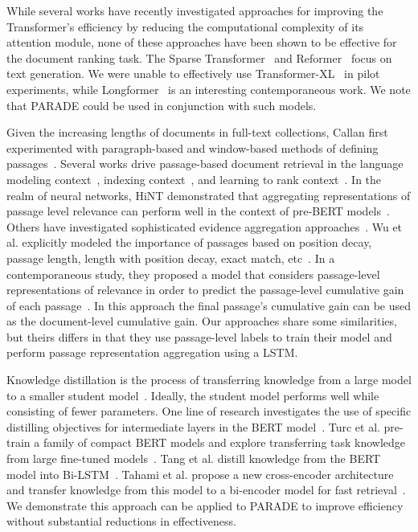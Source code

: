 \documentclass[11pt,a4paper]{article}
\begin{document}
While several works have recently investigated approaches for improving the Transformer's efficiency by reducing the computational complexity of its attention module, none of these approaches have been shown to be effective for the document ranking task. 
The Sparse Transformer~\cite{DBLP:journals/corr/abs-1904-10509} and  Reformer~\cite{DBLP:conf/iclr/KitaevKL20} focus on text generation. 
We were unable to effectively use Transformer-XL~\cite{DBLP:conf/acl/DaiYYCLS19} in pilot experiments, 
while Longformer~\cite{DBLP:journals/corr/abs-2004-05150} is an interesting contemporaneous work. 
We note that PARADE could be used in conjunction with such models.


Given the increasing lengths of documents in full-text collections, Callan first experimented with paragraph-based and window-based methods of defining passages~\cite{DBLP:conf/sigir/Callan94}.
Several works drive passage-based document retrieval in the language modeling context~\cite{DBLP:conf/cikm/LiuC02,DBLP:conf/ecir/BenderskyK08}, indexing context~\cite{DBLP:journals/bmcbi/Lin09}, and learning to rank context~\cite{DBLP:journals/ir/SheetritSK20}.
In the realm of neural networks, 
HiNT demonstrated that aggregating representations of passage level relevance can perform well in the context of pre-BERT models~\cite{DBLP:conf/sigir/FanGLXZC18}.
Others have investigated sophisticated evidence aggregation approaches~\cite{DBLP:conf/iclr/ZhaoXRSBT20,DBLP:conf/acl/ZhouHYLWLS19}.
Wu et al. explicitly modeled the importance of passages based on position decay, passage length, length with position decay, exact match, etc~\cite{DBLP:conf/sigir/WuML0M19}.
In a contemporaneous study, they proposed a model that considers passage-level representations of relevance in order to predict the passage-level cumulative gain of each passage~\cite{wuleveraging}.
In this approach the final passage's cumulative gain can be used as the document-level cumulative gain.
Our approaches share some similarities, but theirs differs in that they use passage-level labels to train their model and perform passage representation aggregation using a LSTM. 

Knowledge distillation is the process of transferring knowledge from a large model to a smaller student model~\cite{DBLP:conf/nips/BaC14,DBLP:journals/corr/HintonVD15}.
Ideally, the student model performs well while consisting of fewer parameters.
One line of research investigates the use of specific distilling objectives for intermediate layers in the BERT model~\cite{DBLP:journals/corr/abs-1909-10351,DBLP:conf/emnlp/SunCGL19}.
Turc et al. pre-train a family of compact BERT models and explore transferring task knowledge from large fine-tuned models~\cite{DBLP:journals/corr/abs-1908-08962}.
Tang et al. distill knowledge from the BERT model into Bi-LSTM~\cite{DBLP:journals/corr/abs-1903-12136}.
Tahami et al. propose a new cross-encoder architecture and transfer knowledge from this model to a bi-encoder model for fast retrieval~\cite{DBLP:journals/corr/abs-2004-11045}.
We demonstrate this approach can be applied to PARADE to improve efficiency without substantial reductions in effectiveness.
\end{document}
